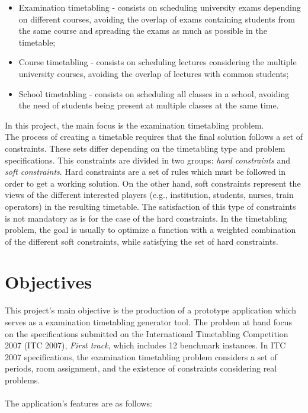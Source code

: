 \begin{itemize}
	\item Examination timetabling - consists on scheduling university exams depending on different courses, avoiding the overlap of exams containing students from the same course and spreading the exams as much as possible in the timetable;
	\item Course timetabling - consists on scheduling lectures considering the multiple university courses, avoiding the overlap of lectures with common students;
	\item School timetabling - consists on scheduling all classes in a school, avoiding the need of students being present at multiple classes at the same time.
\end{itemize}

In this project, the main focus is the examination timetabling problem. \\

The process of creating a timetable requires that the final solution follows a set of constraints. These sets differ depending on the timetabling type and problem specifications. This constraints are divided in two groups: \textit{hard constraints} and \textit{soft constraints}. Hard constraints are a set of rules which must be followed in order to get a working solution. On the other hand, soft constraints represent the views of the different interested players (e.g., institution, students, nurses, train operators) in the resulting timetable. The satisfaction of this type of constraints is not mandatory as is for the case of the hard constraints. In the timetabling problem, the goal is usually to optimize a function with a weighted combination of the different soft constraints, while satisfying the set of hard constraints. 

\section{Objectives}
\label{section:Objts}

This project's main objective is the production of a prototype application which serves as a examination timetabling generator tool. The problem at hand focus on the specifications submitted on the International Timetabling Competition 2007 (ITC 2007), \textit{First track}, which includes 12 benchmark instances. In ITC 2007 specifications, the examination timetabling problem considers a set of periods, room assignment, and the existence of constraints considering real problems.\\
\\
The application's features are as follows:

